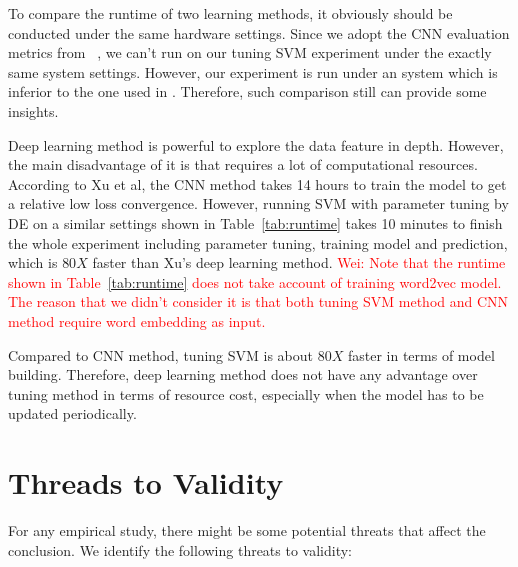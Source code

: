 \documentclass[sigconf,review, anonymous]{acmart}
\theoremstyle{break}
\newcommand{\wei}[1]{\textcolor{red}{Wei: #1}}
\newcommand{\tab}[1]{Table~\ref{tab:#1}}
\begin{document}
 To compare the runtime of two learning methods, it obviously should be conducted under the
 same hardware settings. Since we adopt the CNN evaluation metrics from ~\cite{xu2016predicting},
 we can't run on our tuning SVM experiment under the exactly same system settings. However, our experiment
 is run under an system which is inferior to the one used in \cite{xu2016predicting}. Therefore, such comparison
 still can provide some insights. 
 
 
 \begin{table}[!htp]
\centering
\caption{Comparison of Runtime and System   }
\label{tab:runtime}
\end{table}
 
Deep learning method is  powerful to explore the data feature in depth.
However, the main disadvantage of it is that requires a lot of computational resources.
 According to Xu et al, the CNN method takes 14 hours to train the model
to get a relative low loss convergence. However, running  SVM with parameter tuning
by DE on a similar settings shown in \tab{runtime} takes 10 minutes to finish 
the whole experiment including parameter tuning, training model and prediction,
which is $80X$ faster than  Xu's deep learning method.
\wei{Note that the runtime shown in \tab{runtime} does not take account of training word2vec model.
 The reason that we didn't consider it is that both tuning SVM method and CNN method require word embedding as input.}
 
 \begin{lesson}
Compared to CNN method, tuning SVM is about $80X$ faster in terms of model building.
Therefore, deep learning method does not have any advantage over tuning method in terms
of resource cost, especially when the model has to be updated periodically. 
 \end{lesson}
 
 
 
\section{Threads to Validity}
For any empirical study, there might be some potential threats that
affect the conclusion. We identify the following threats to validity:
\end{document}
